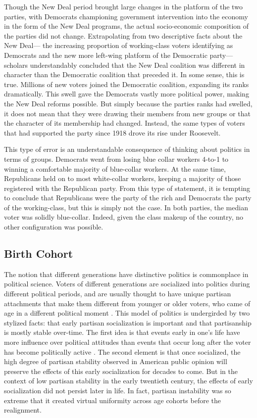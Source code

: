\documentclass[11pt]{scrartcl}\usepackage[]{graphicx}\usepackage[]{color}
\begin{document}
Though the New Deal period brought large changes in the platform of the two parties, with Democrats championing government intervention into the economy in the form of the New Deal programs, the actual socio-economic composition of the parties did not change.  Extrapolating from two descriptive facts about the New Deal--- the increasing proportion of working-class voters identifying as Democrats and the new more left-wing platform of the Democratic party--- scholars understandably concluded that the New Deal coalition was different in character than the Democratic coalition that preceded it.  In some sense, this is true. Millions of new voters joined the Democratic coalition, expanding its ranks dramatically. This swell gave the Democrats vastly more political power, making the New Deal reforms possible. But simply because the parties ranks had swelled, it does not mean that they were drawing their members from new groups or that the character of its membership had changed. Instead, the same types of voters that had supported the party since 1918 drove its rise under Roosevelt. 

This type of error is an understandable consequence of thinking about politics in terms of groups. Democrats went from losing blue collar workers 4-to-1 to winning a comfortable majority of blue-collar workers.  At the same time, Republicans held on to most white-collar workers, keeping a majority of those registered with the Republican party. From this type of statement, it is tempting to conclude that Republicans were the party of the rich and Democrats the party of the working-class, but this is simply not the case. In both parties, the median voter was solidly blue-collar.  Indeed, given the class makeup of the country, no other configuration was possible.

\subsection*{Birth Cohort}

The notion that different generations have distinctive politics is commonplace in political science. Voters of different generations are socialized into politics during different political periods, and are usually thought to have unique partisan attachments that make them different from younger or older voters, who came of age in a different political moment \citep{klecka1971applying}. This model of politics is undergirded by two stylized facts: that early partisan socialization is important and that partisanship is mostly stable over-time. The first idea is that events early in one's life have more influence over political attitudes than events that occur long after the voter has become politically active \citep{sears1997politics,bartels2014generational,ghitza2014great}. The second element is that once socialized, the high degree of partisan stability observed in American public opinion will preserve the effects of this early socialization for decades to come. But in the context of low partisan stability in the early twentieth century, the effects of early socialization did not persist later in life. In fact, partisan instability was so extreme that it created virtual uniformity across age cohorts before the realignment. 
\end{document}
